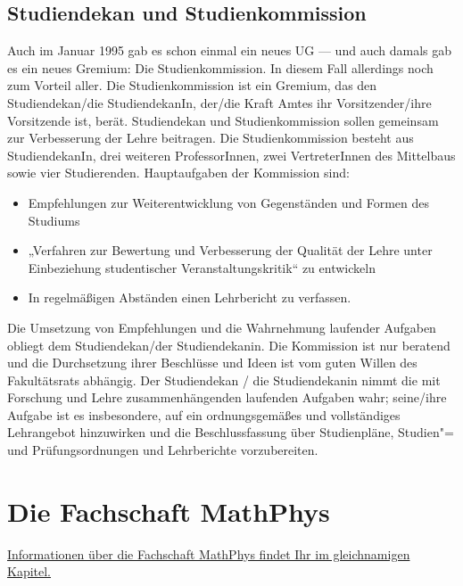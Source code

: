 \subsection{Studiendekan und Studienkommission}

Auch im Januar 1995 gab es schon einmal ein neues UG — und auch damals gab es ein
neues Gremium: Die Studienkommission. In diesem Fall allerdings noch zum Vorteil
aller. Die Studienkommission ist ein Gremium, das den Studiendekan/die
StudiendekanIn, der/die Kraft Amtes ihr Vorsitzender/ihre Vorsitzende ist, berät.
Studiendekan und Studienkommission sollen gemeinsam zur Verbesserung der Lehre
beitragen. Die Studienkommission besteht aus StudiendekanIn, drei weiteren
ProfessorInnen, zwei VertreterInnen des Mittelbaus sowie vier Studierenden.
Hauptaufgaben der Kommission sind:
\begin{itemize}
    \addtolength{\itemsep}{-0.7\baselineskip}
    \item Empfehlungen zur Weiterentwicklung von Gegenständen und Formen des Studiums
    \item „Verfahren zur Bewertung und Verbesserung  der Qualität der Lehre unter
          Einbeziehung studentischer Veranstaltungskritik“ zu entwickeln
    \item In regelmäßigen Abständen einen Lehrbericht zu verfassen.
\end{itemize}


Die Umsetzung von Empfehlungen und die Wahrnehmung laufender Aufgaben
obliegt dem Studiendekan/der Studiendekanin. Die Kommission ist nur
beratend und die Durchsetzung ihrer Beschlüsse und Ideen ist vom guten
Willen des Fakultätsrats abhängig. Der Studiendekan / die Studiendekanin
nimmt die mit Forschung und Lehre zusammenhängenden laufenden Aufgaben
wahr; seine/ihre Aufgabe ist es insbesondere, auf ein ordnungsgemäßes und
vollständiges Lehrangebot hinzuwirken und die Beschlussfassung über
Studienpläne, Studien"= und Prüfungsordnungen und Lehrberichte
vorzubereiten.


\section{Die Fachschaft MathPhys}
\hyperref[diefsmathphys]{Informationen über die Fachschaft MathPhys findet Ihr im gleichnamigen Kapitel.}

